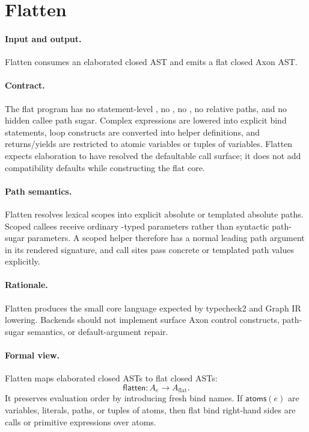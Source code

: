 \section{Flatten}

\paragraph{Input and output.}
Flatten consumes an elaborated closed AST and emits a flat closed Axon AST.

\paragraph{Contract.}
The flat program has no statement-level , no , no
, no relative paths, and no hidden callee path sugar.  Complex
expressions are lowered into explicit bind statements, loop constructs are
converted into helper definitions, and returns/yields are restricted to atomic
variables or tuples of variables.  Flatten expects elaboration to have resolved
the defaultable call surface; it does not add compatibility defaults while
constructing the flat core.

\paragraph{Path semantics.}
Flatten resolves lexical scopes into explicit absolute or templated absolute
paths.  Scoped callees receive ordinary -typed parameters rather
than syntactic path-sugar parameters.  A scoped helper therefore has a normal
leading path argument in its rendered signature, and call sites pass concrete
or templated path values explicitly.

\paragraph{Rationale.}
Flatten produces the small core language expected by typecheck2 and Graph IR
lowering.  Backends should not implement surface Axon control constructs,
path-sugar semantics, or default-argument repair.

\paragraph{Formal view.}
Flatten maps elaborated closed ASTs to flat closed ASTs:
\[
  \mathsf{flatten}: A_e \rightarrow A_{\mathrm{flat}}.
\]
It preserves evaluation order by introducing fresh bind names.  If
\(\mathsf{atoms}(e)\) are variables, literals, paths, or tuples of atoms, then
flat bind right-hand sides are calls or primitive expressions over atoms.

